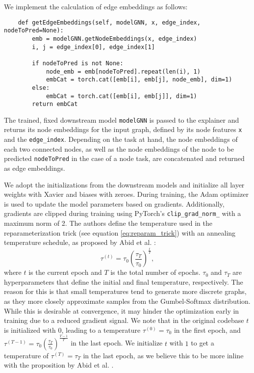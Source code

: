 We implement the calculation of edge embeddings as follows:
\begin{verbatim}
    def getEdgeEmbeddings(self, modelGNN, x, edge_index, nodeToPred=None):
        emb = modelGNN.getNodeEmbeddings(x, edge_index)
        i, j = edge_index[0], edge_index[1]
        
        if nodeToPred is not None:
            node_emb = emb[nodeToPred].repeat(len(i), 1)
            embCat = torch.cat([emb[i], emb[j], node_emb], dim=1)
        else:
            embCat = torch.cat([emb[i], emb[j]], dim=1)
        return embCat
\end{verbatim}
The trained, fixed downstream model \verb|modelGNN| is passed to the explainer and returns its node embeddings for the input graph, defined by its node features \verb|x| and the \verb|edge_index|. Depending on the task at hand, the node embeddings of each two connected nodes, as well as the node embeddings of the node to be predicted \verb|nodeToPred| in the case of a node task, are concatenated and returned as edge embeddings. \bigskip

We adopt the initializations from the downstream models and initialize all layer weights with Xavier \cite{glorot2010understanding} and biases with zeroes. During training, the Adam optimizer \cite{kingma2014adam} is used to update the model parameters based on gradients. Additionally, gradients are clipped during training using PyTorch's \verb|clip_grad_norm_| with a maximum norm of 2. The authors define the temperature used in the reparameterization trick (see equation \ref{eq:reparam_trick}) with an annealing temperature schedule, as proposed by Abid et al. \cite{abid2019concrete}:
\begin{equation}
    \tau^{(t)} = \tau_0(\frac{\tau_T}{\tau_0})^{\frac{t}{T}},
\end{equation} 
where $t$ is the current epoch and $T$ is the total number of epochs. $\tau_0$ and $\tau_T$ are hyperparameters that define the initial and final temperature, respectively.
The reason for this is that small temperatures tend to generate more discrete graphs, as they more closely approximate samples from the Gumbel-Softmax distribution. While this is desirable at convergence, it may hinder the optimization early in training due to a reduced gradient signal. We note that in the original codebase $t$ is initialized with $0$, leading to a temperature $\tau^{(0)} = \tau_0$ in the first epoch, and $\tau^{(T-1)} = \tau_0(\frac{\tau_T}{\tau_0})^{\frac{T-1}{T}}$ in the last epoch. We initialize $t$ with $1$ to get a temperature of $\tau^{(T)} = \tau_T$ in the last epoch, as we believe this to be more inline with the proposition by Abid et al. \cite{abid2019concrete}.


